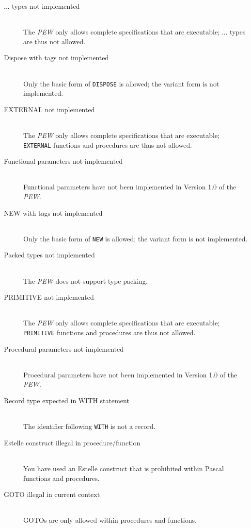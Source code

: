 \begin{description}
\item[... types not implemented]\mbox{}\\
The {\em PEW} only allows complete specifications that are
executable; ... types are thus not allowed.

\item[Dispose with tags not implemented]\mbox{}\\
Only the basic form of {\tt DISPOSE} is allowed; the variant form
is not implemented.

\item[EXTERNAL not implemented]\mbox{}\\
The {\em PEW} only allows complete specifications that are
executable; {\tt EXTERNAL} functions and procedures are thus not allowed.

\item[Functional parameters not implemented]\mbox{}\\
Functional parameters have not been implemented in Version 1.0 of the {\em PEW}.

\item[NEW with tags not implemented]\mbox{}\\
Only the basic form of {\tt NEW} is allowed; the variant form
is not implemented.

\item[Packed types not implemented]\mbox{}\\
The {\em PEW} does not support type packing.

\item[PRIMITIVE not implemented]\mbox{}\\
The {\em PEW} only allows complete specifications that are
executable; {\tt PRIMITIVE} functions and procedures are thus not allowed.

\item[Procedural parameters not implemented]\mbox{}\\
Procedural parameters have not been implemented in Version 1.0 of the {\em PEW}.

\item[Record type expected in WITH statement]\mbox{}\\
The identifier following {\tt WITH} is not a record.

\item[Estelle construct illegal in procedure/function]\mbox{}\\
You have used an Estelle construct that is prohibited within Pascal
functions and procedures.

\item[GOTO illegal in current context]\mbox{}\\
GOTOs are only allowed within procedures and functions.


\end{description}
